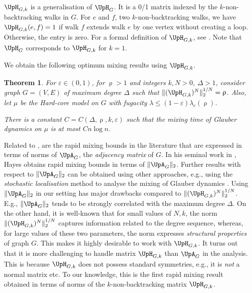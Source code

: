\documentclass[11pt,reqno]{amsart}
\numberwithin{equation}{section}
\newtheorem{theorem}{Theorem}[section]
\newcommand{\blue}[1]{{\color{blue}#1}}
\newcommand{\bluepigment}[1]{{\color{blue(pigment)}#1}}
\newcommand{\byzantine}[1]{{\color{byzantine}#1}}
\newcommand{\cadmiumgreen}[1]{{\color{cadmiumgreen}#1}}
\newcommand{\deeppink}[1]{{\color{deeppink}#1}}
\newcommand{\goldenbrown}[1]{{\color{goldenbrown}#1}}
\newcommand{\maxDeg}{{\Delta}}
\newcommand{\lcritical}{{\lambda_c}}
\newcommand{\norm}[2]{\goldenbrown{\|} #1 \goldenbrown{\|}_{#2}}
\newcommand{\nnorm}[3]{\goldenbrown{\|} #1\goldenbrown{\|}^{#2}_{#3}}
\newcommand{\Adjacency}{{\UpA}}
\newcommand{\NBMatrix}{\cadmiumgreen{\UpH}_{G,\kk}}
\newcommand{\NBMatrixE}{\byzantine{\UpH}}
\renewcommand{\blue}[1]{#1}
\renewcommand{\bluepigment}[1]{#1}
\renewcommand{\byzantine}[1]{#1}
\renewcommand{\cadmiumgreen}[1]{#1}
\renewcommand{\deeppink}[1]{#1}
\renewcommand{\goldenbrown}[1]{#1}
\newcommand{\ke}{\blue{e}}
\newcommand{\kf}{\deeppink{f}}
\newcommand{\kk}{\bluepigment{k}}
\renewcommand{\ke}{e}
\renewcommand{\kf}{f}
\renewcommand{\kk}{k}
\newcommand{\SingBound}{\uprho}
\begin{document}
 $\NBMatrix$ is a generalisation of $\NBMatrixE_G$.  It is a    0/1 matrix indexed by the $\kk$-non-backtracking walks 
 in $G$. For    $\ke$ and $\kf$, two $\kk$-non-backtracking walks, 
% 
we have $\NBMatrix(\ke,\kf)=1$ if walk $\kf$ extends walk $\ke$ 
by one vertex without creating a loop. Otherwise, the entry is zero.   
%
For a formal definition of $\NBMatrix$, see 
. 
Note that $\NBMatrixE_G$ corresponds to $\NBMatrix$ for $\kk=1$. 




We obtain the following optimum mixing results using $\NBMatrix$.
 
\begin{theorem}\label{thrm:HC4SPRadiusHash}
For $\varepsilon \in (0,1)$, for $\SingBound>1$ and integers $k,N>0$, $\maxDeg>1$, consider graph 
$G=(V,E)$ of maximum degree $\maxDeg$ such that $\nnorm{ (\NBMatrix)^N}{1/N}{2}=\SingBound$.
Also, let $\mu$ be the Hard-core model on $G$ with fugacity $\lambda\leq (1-\varepsilon)\lcritical(\SingBound)$.

There is a constant $C={C(\maxDeg,\SingBound,\kk,\varepsilon)}$ such that the mixing time of Glauber dynamics on $\mu$ 
is at most $C n\log n$.
\end{theorem}


Related to , are the rapid mixing bounds in the literature that are expressed in terms of norms of   $\Adjacency_G$, 
the {\em adjacency matrix} of $G$.  
In his seminal work  in \cite{Hayes06}, Hayes obtains rapid mixing bounds in terms of $\norm{\Adjacency_G}{2}$.
%
Further results with respect to $\norm{\Adjacency_G}{2}$  can be obtained using other approaches, e.g.,
using  the  {\em stochastic localisation} method to analyse the mixing of Glauber dynamics \cite{FastMCMCLocalisation}.  
%
Using $\norm{\Adjacency_G}{2}$ in our setting has major drawbacks compared to 
$\nnorm{ (\NBMatrix)^N}{1/N}{2}$.   E.g., $\norm{\Adjacency_G}{2}$ tends to be  strongly correlated 
with the maximum degree  $\maxDeg$. %
% 
%
On the other hand,  it is well-known that  for small values of $N,\kk$,  the norm  $\nnorm{ (\NBMatrix)^N}{1/N}{2}$ captures 
information related to the degree sequence, whereas,   for large values of these two parameters, the norm expresses 
{\em structural properties} of graph $G$. 
%
This makes it highly desirable to work with $\NBMatrix$.  It turns out that it is  more challenging to handle matrix $\NBMatrix$ 
than $\Adjacency_G$  in the analysis.  This is because $\NBMatrix$  does not possess  standard symmetries, e.g.,  it is {\em not} a normal matrix etc.
%
To our  knowledge, this is the first rapid mixing result  obtained in terms of norms of the  $\kk$-non-backtracking 
matrix $\NBMatrix$. 
\end{document}
